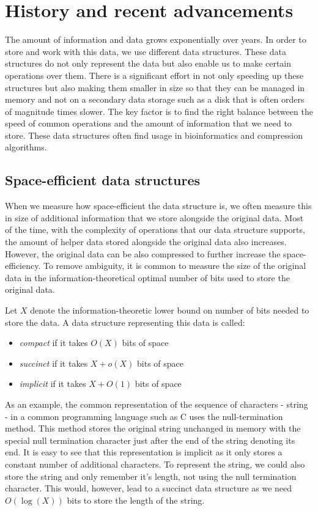 \chapter{History and recent advancements}
\label{kap:kap1}

The amount of information and data grows exponentially over years. In order to store and work with this data, we use different data structures. These data structures do not only represent the data but also enable us to make certain operations over them. There is a significant effort in not only speeding up these structures but also making them smaller in size so that they can be managed in memory and not on a secondary data storage such as a disk that is often orders of magnitude times slower. The key factor is to find the right balance between the speed of common operations and the amount of information that we need to store. These data structures often find usage in bioinformatics and compression algorithms.

\section{Space-efficient data structures}

When we measure how space-efficient the data structure is, we often measure this in size of additional information that we store alongside the original data. Most of the time, with the complexity of operations that our data structure supports, the amount of helper data stored alongside the original data also increases. However, the original data can be also compressed to further increase the space-efficiency. To remove ambiguity, it is common to measure the size of the original data in the information-theoretical optimal number of bits used to store the original data.

\begin{definition}
Let $X$ denote the information-theoretic lower bound on number of bits needed to store the data. A data structure representing this data is called:
\begin{itemize}
    \item \emph{compact} if it takes $O(X)$ bits of space
    \item \emph{succinct} if it takes $X + o(X)$ bits of space
    \item \emph{implicit} if it takes $X + O(1)$ bits of space
\end{itemize}
\end{definition}

As an example, the common representation of the sequence of characters - string - in a common programming language such as C uses the null-termination method. This method stores the original string unchanged in memory with the special null termination character just after the end of the string denoting its end. It is easy to see that this representation is implicit as it only stores a constant number of additional characters. To represent the string, we could also store the string and only remember it's length, not using the null termination character. This would, however, lead to a succinct data structure as we need $O(\log(X))$ bits to store the length of the string.

